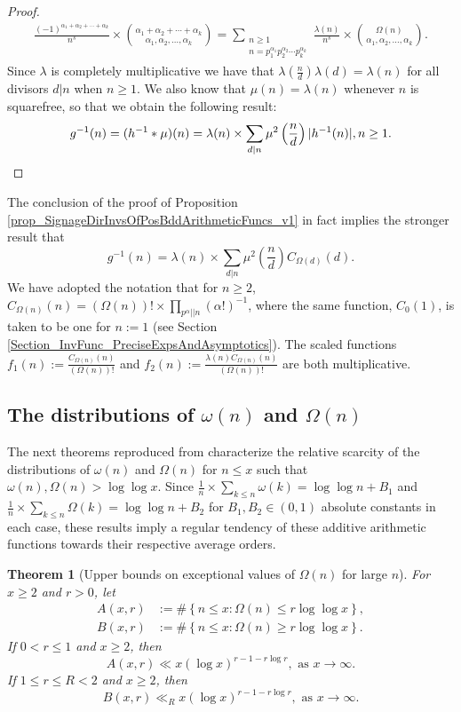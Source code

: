 \documentclass[11pt,reqno,a4letter]{article}
\numberwithin{figure}{section}
\numberwithin{table}{section}
\theoremstyle{plain}
\newtheorem{theorem}{Theorem}
\numberwithin{theorem}{section}
\theoremstyle{definition}
\begin{document}
\begin{proof}
\begin{align*}
     \frac{(-1)^{\alpha_1+\alpha_2+\cdots+\alpha_k}}{n^s} \times 
     \binom{\alpha_1+\alpha_2+\cdots+\alpha_k}{\alpha_1,\alpha_2,\ldots,\alpha_k} = 
     \sum_{\substack{n \geq 1 \\ n =p_1^{\alpha_1}p_2^{\alpha_2} \cdots p_k^{\alpha_k}}} 
     \frac{\lambda(n)}{n^s} \times \binom{\Omega(n)}{\alpha_1,\alpha_2,\ldots,\alpha_k}. 
\end{align*}
Since $\lambda$ is completely multiplicative we have that 
$\lambda\left(\frac{n}{d}\right) \lambda(d) = \lambda(n)$ for all divisors 
$d|n$ when $n \geq 1$. We also know that $\mu(n) = \lambda(n)$ whenever $n$ is squarefree, 
so that we obtain the following result: 
\[
g^{-1}(n) = (h^{-1} \ast \mu)(n) = \lambda(n) \times \sum_{d|n} \mu^2\left(\frac{n}{d}\right) |h^{-1}(n)|, n \geq 1. 
     \qedhere 
\]
\end{proof} 

The conclusion of the proof of 
Proposition \ref{prop_SignageDirInvsOfPosBddArithmeticFuncs_v1} 
in fact implies the stronger result that 
\[
g^{-1}(n) = \lambda(n) \times \sum_{d|n} \mu^2\left(\frac{n}{d}\right) C_{\Omega(d)}(d).  
\]
We have adopted the notation that for $n \geq 2$, 
$C_{\Omega(n)}(n) = (\Omega(n))! \times \prod_{p^{\alpha} || n} (\alpha!)^{-1}$, 
where the same function, $C_0(1)$, is taken to be one for $n := 1$ 
(see Section \ref{Section_InvFunc_PreciseExpsAndAsymptotics}). 
The scaled functions $f_1(n) := \frac{C_{\Omega(n)}(n)}{(\Omega(n))!}$ and 
$f_2(n) := \frac{\lambda(n) C_{\Omega(n)}(n)}{(\Omega(n))!}$ are both multiplicative. 

\subsection{The distributions of $\omega(n)$ and $\Omega(n)$} 

The next theorems reproduced from \cite[\S 7.4]{MV} characterize the relative 
scarcity of the distributions of $\omega(n)$ and $\Omega(n)$ for $n \leq x$ such that 
$\omega(n),\Omega(n) > \log\log x$. 
Since $\frac{1}{n} \times \sum_{k \leq n} \omega(k) = \log\log n + B_1$ and 
$\frac{1}{n} \times \sum_{k \leq n} \Omega(k) = \log\log n + B_2$ for $B_1,B_2 \in (0, 1)$ 
absolute constants in each case, 
these results imply a regular tendency 
of these additive arithmetic functions towards their respective average orders. 

\begin{theorem}[Upper bounds on exceptional values of $\Omega(n)$ for large $n$] 
\label{theorem_MV_Thm7.20-init_stmt} 
For $x \geq 2$ and $r > 0$, let 
\begin{align*} 
A(x, r) & := \#\left\{n \leq x: \Omega(n) \leq r \log\log x\right\}, \\ 
B(x, r) & := \#\left\{n \leq x: \Omega(n) \geq r \log\log x\right\}. 
\end{align*} 
If $0 < r \leq 1$ and $x \geq 2$, then 
\[
A(x, r) \ll x (\log x)^{r-1 - r\log r}, \text{ \ as\ } x \rightarrow \infty. 
\]
If $1 \leq r \leq R < 2$ and $x \geq 2$, then 
\[
B(x, r) \ll_R x (\log x)^{r-1-r \log r}, \text{ \ as\ } x \rightarrow \infty. 
\]
\end{theorem} 
\end{document}
